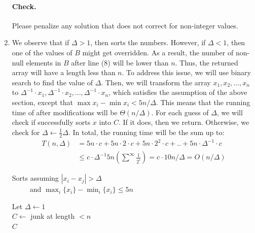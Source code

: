 \begin{enumerate}
  \paragraph{Check.} Please penalize any solution that does not correct for non-integer values.
\fi
\item We observe that if $\Delta > 1$, then  sorts the numbers. However, if $\Delta < 1$, then one of the values of $B$ might get overridden. As a result, the number of non-null elements in $B$ after line (8) will be lower than $n$. Thus, the returned array will have a length less than $n$. To address this issue, we will use binary search to find the value of $\Delta$. Then, we will transform the array $x_{1}, x_{2}, ..., x_{n}$ to $\Delta^{-1} \cdot x_{1}, \Delta^{-1} \cdot x_{2}, ..., \Delta^{-1} \cdot x_{n}$, which satisfies the assumption of the above section, except that $\max x_{i} - \min x_{i} < 5n/\Delta$. This means that the running time of  after modifications will be $\Theta(n/\Delta)$. For each guess of $\Delta$, we will check if  successfully sorts $x$ into $C$. If it does, then we return. Otherwise, we check for $\Delta \leftarrow \frac{1}{2}\Delta$. In total, the running time will be the sum up to:
  \begin{equation*}
    \begin{split}
      T(n,\Delta) &= 5n \cdot c + 5n \cdot 2 \cdot c + 5n \cdot 2^{2} \cdot c + .. + 5n \cdot \Delta^{-1} \cdot c \\ 
      & \le  c \cdot \Delta^{-1}5n\left( \sum^{\infty} \frac{1}{2^{i}} \right)  = c \cdot 10n/\Delta = O(n/\Delta)
    \end{split}
  \end{equation*}

  \begin{algorithm}[H]
\caption{Sorts assuming $|x_{i} - x_{j}| > \Delta$ \\ \ \ \ \ \ and $ \max_{i} \{x_{i}\} -\min_{i} \{x_{i}\} \leq 5n$} \label{alg:auss2}
     Let $\Delta \leftarrow 1$ \\
     $C \leftarrow $ junk at length $< n $\\ 
    \Return $C$
\end{algorithm}

\end{enumerate}
\fi 
